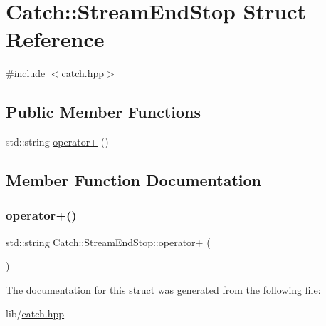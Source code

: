 \hypertarget{struct_catch_1_1_stream_end_stop}{}\section{Catch\+:\+:Stream\+End\+Stop Struct Reference}
\label{struct_catch_1_1_stream_end_stop}


{\ttfamily \#include $<$catch.\+hpp$>$}

\subsection*{Public Member Functions}
\begin{DoxyCompactItemize}
\item 
std\+::string \hyperlink{struct_catch_1_1_stream_end_stop_a3025092e06c224e0845f2caa07b26d0e}{operator+} ()
\end{DoxyCompactItemize}


\subsection{Member Function Documentation}
\hypertarget{struct_catch_1_1_stream_end_stop_a3025092e06c224e0845f2caa07b26d0e}{}\label{struct_catch_1_1_stream_end_stop_a3025092e06c224e0845f2caa07b26d0e} 
\subsubsection{\texorpdfstring{operator+()}{operator+()}}
{\footnotesize\ttfamily std\+::string Catch\+::\+Stream\+End\+Stop\+::operator+ (\begin{DoxyParamCaption}{ }\end{DoxyParamCaption})\hspace{0.3cm}{\ttfamily [inline]}}



The documentation for this struct was generated from the following file\+:\begin{DoxyCompactItemize}
\item 
lib/\hyperlink{catch_8hpp}{catch.\+hpp}\end{DoxyCompactItemize}
